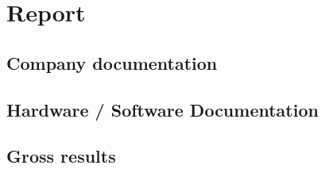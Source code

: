 \documentclass[a4paper,12pt, twoside]{report}
\begin{document}

\part{Report}

\appendix
\chapter{Company documentation}
\chapter{Hardware / Software Documentation}
\chapter{Gross results}
\end{document}
